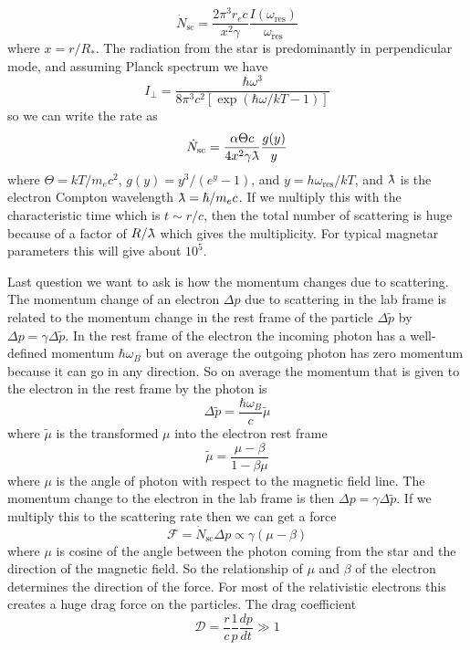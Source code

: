 \documentclass[letterpaper, 11pt]{article}
\newcommand{\lambdabar}{{\mkern0.75mu\mathchar '26\mkern -9.75mu\lambda}}
\numberwithin{equation}{section}
\numberwithin{figure}{section}
\begin{document}
\begin{equation}
    \label{eq:62}
    \dot{N}_\mathrm{sc} = \frac{2\pi^3r_ec}{x^2\gamma}\frac{I(\omega_\mathrm{res})}{\omega_\mathrm{res}}
\end{equation}
where $x = r/R_{*}$. The radiation from the star is predominantly in perpendicular mode, and assuming Planck spectrum we have
\begin{equation}
    \label{eq:63}
    I_{\perp} = \frac{\hbar\omega^3}{8\pi^3c^2 \left[ \exp \left( \hbar\omega/kT - 1 \right) \right]}
\end{equation}
so we can write the rate as
\begin{equation}
    \label{eq:64}
    \dot{N}_\mathrm{sc} = \frac{\alpha\Theta c}{4x^2\gamma \lambdabar}\frac{g(y)}{y}
\end{equation}
where $\Theta = kT/m_ec^2$, $g(y) = y^3/(e^y - 1)$, and $y = h\omega_\mathrm{res}/kT$, and $\lambdabar$ is the electron Compton wavelength $\lambdabar = \hbar/m_ec$. If we multiply this with the characteristic time which is $t \sim r/c$, then the total number of scattering is huge because of a factor of $R/\lambdabar$ which gives the multiplicity. For typical magnetar parameters this will give about $10^5$.

Last question we want to ask is how the momentum changes due to scattering. The momentum change of an electron $\Delta p$ due to scattering in the lab frame is related to the momentum change in the rest frame of the particle $\Delta \tilde{p}$ by $\Delta p = \gamma \Delta \tilde{p}$. In the rest frame of the electron the incoming photon has a well-defined momentum $\hbar\omega_B$ but on average the outgoing photon has zero momentum because it can go in any direction. So on average the momentum that is given to the electron in the rest frame by the photon is
\begin{equation}
    \label{eq:65}
    \Delta \tilde{p} = \frac{\hbar\omega_B}{c}\tilde{\mu}
\end{equation}
where $\tilde{\mu}$ is the transformed $\mu$ into the electron rest frame
\begin{equation}
    \label{eq:68}
    \tilde{\mu} = \frac{\mu - \beta}{1 - \beta\mu}
\end{equation}
where $\mu$ is the angle of photon with respect to the magnetic field line. The momentum change to the electron in the lab frame is then $\Delta p = \gamma \Delta \tilde{p}$. If we multiply this to the scattering rate then we can get a force
\begin{equation}
    \label{eq:66}
    \mathcal{F} = \dot{N}_\mathrm{sc}\Delta p \propto \gamma(\mu - \beta)
\end{equation}
where $\mu$ is cosine of the angle between the photon coming from the star and the direction of the magnetic field. So the relationship of $\mu$ and $\beta$ of the electron determines the direction of the force. For most of the relativistic electrons this creates a huge drag force on the particles. The drag coefficient
\begin{equation}
    \label{eq:67}
    \mathcal{D} = \frac{r}{c}\frac{1}{p}\frac{dp}{dt} \gg 1
\end{equation}
\end{document}
